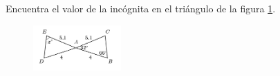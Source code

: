 \question[10]  Encuentra el valor de la incógnita en el triángulo de la figura \ref{fig:angle_triangle_28}.
\begin{figure}[H]
    \begin{center}
        \includegraphics[width=0.3\textwidth]{../images/angle_triangle_28.png}
    \end{center}
    \caption{}
    \label{fig:angle_triangle_28}
\end{figure}